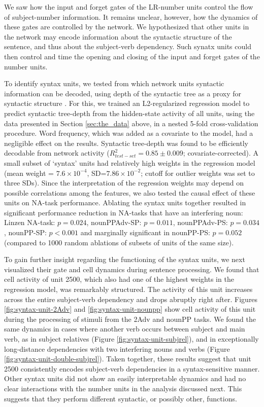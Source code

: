 We saw how the input and forget gates of the LR-number units control the flow of subject-number information. It remains unclear, however, how the dynamics of these gates are controlled by the network. We hypothesized that other units in the network may encode information about the syntactic structure of the sentence, and thus about the subject-verb dependency. Such synatx units could then control and time the opening and closing of the input and forget gates of the number units. 

To identify syntax units, we tested from which network units syntactic information can be decoded, using depth of the syntactic tree as a proxy for syntactic structure \cite{Nelson:etal:2017}. For this, we trained an L2-regularized regression model to predict syntactic tree-depth from the hidden-state activity of all units, using the data presented in Section \ref{sec:the_data} above, in a nested 5-fold cross-validation procedure. Word frequency, which was added as a covariate to the model, had a negligible effect on the results. Syntactic tree-depth was found to be efficiently decodable from network activity ($R^2_{test-set}=0.85\pm0.009$; covariate-corrected). A small subset of `syntax' units had relatively high weights in the regression model (mean weight = $7.6\times{}10^{-4}$, SD=$7.86\times{}10^{-2}$; cutoff for outlier weights was set to three SDs). Since the interpretation of the regression weights may depend on possible correlations among the features, we also tested the causal effect of these units on NA-task performance. Ablating the syntax units together resulted in significant performance reduction in NA-tasks that have an interfering noun: Linzen NA-task: $p=0.024$, nounPPAdv-SP: $p=0.011$, nounPPAdv-PS: $p=0.034$, nounPP-SP: $p<0.001$ and marginally significant in nounPP-PS: $p=0.052$ (compared to 1000 random ablations of subsets of units of the same size).

To gain further insight regarding the functioning of the syntax units, we next visualized their gate and cell dynamics during sentence processing. We found that cell activity of unit \unit{2}{500}, which also had one of the highest weights in the
regression model, was remarkably structured. The activity of
this unit increases across the entire subject-verb
dependency and drops abruptly right after. Figures
\ref{fig:syntax-unit-2Adv} and \ref{fig:syntax-unit-nounpp} show cell
activity of this unit during the processing of stimuli from the 2Adv
and nounPP tasks. We found the same dynamics in cases where another
verb occurs between subject and main verb, as in subject relatives
(Figure \ref{fig:syntax-unit-subjrel}), and in exceptionally
long-distance dependencies with two interfering nouns and verbs
(Figure \ref{fig:syntax-unit-double-subjrel}). Taken together, these
results suggest that unit \unit{2}{500} consistently encodes
subject-verb dependencies in a syntax-sensitive manner. Other syntax
units did not show an easily interpretable dynamics and had no clear
interactions with the number units in the analysis discussed next. This
suggests that they perform different syntactic, or possibly other, functions.
